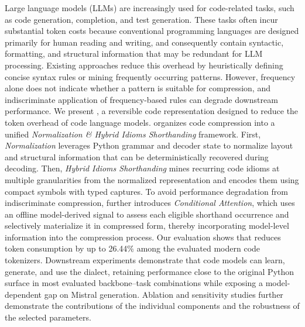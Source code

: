 

Large language models (LLMs) are increasingly used for code-related tasks, such as code generation, completion, and test generation. These tasks often incur substantial token costs because conventional programming languages are designed primarily for human reading and writing, and consequently contain syntactic, formatting, and structural information that may be redundant for LLM processing. Existing approaches reduce this overhead by heuristically defining concise syntax rules or mining frequently occurring patterns. However, frequency alone does not indicate whether a pattern is suitable for compression, and indiscriminate application of frequency-based rules can degrade downstream performance. We present \tool, a reversible code representation designed to reduce the token overhead of code language models. \tool organizes code compression into a unified \textit{Normalization \& Hybrid Idioms Shorthanding} framework. First, \textit{Normalization} leverages Python grammar and decoder state to normalize layout and structural information that can be deterministically recovered during decoding. Then, \textit{Hybrid Idioms Shorthanding} mines recurring code idioms at multiple granularities from the normalized representation and encodes them using compact symbols with typed captures. To avoid performance degradation from indiscriminate compression, \tool further introduces \textit{Conditional Attention}, which uses an offline model-derived signal to assess each eligible shorthand occurrence and selectively materialize it in compressed form, thereby incorporating model-level information into the compression process. Our evaluation shows that \tool reduces token consumption by up to 26.44\% among the evaluated modern code tokenizers. Downstream experiments demonstrate that code models can learn, generate, and use the \tool dialect, retaining performance close to the original Python surface in most evaluated backbone--task combinations while exposing a model-dependent gap on Mistral generation. Ablation and sensitivity studies further demonstrate the contributions of the individual components and the robustness of the selected parameters.
